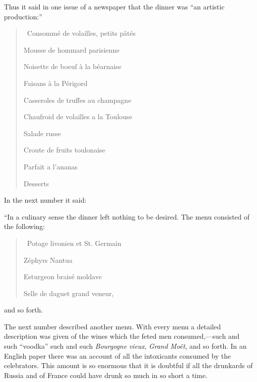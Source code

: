 \documentclass{book}
\begin{document}
Thus it said in one issue of a newspaper that the dinner was “an artistic production:”

\begin{quotation}\
	Consommé de volailles, petits pâtés

	Mousse de hommard parisienne

	Noisette de boeuf à la béarnaise

	Faisans à la Périgord

	Casseroles de truffes au champagne

	Chaufroid de volailles a la Toulouse

	Salade russe

	Croute de fruits toulonaise

	Parfait a l’ananas

	Desserts
\end{quotation}

In the next number it said:

“In a culinary sense the dinner left nothing to be desired. The menu consisted of the following:

\begin{quotation}\
	Potage livonien et St. Germain

	Zéphyrs Nantua

	Esturgeon braisé moldave

	Selle de daguet grand veneur,
\end{quotation}

and so forth.

The next number described another menu. With every menu a detailed description was given of the wines which the feted men consumed,—such and such “voodka” such and such \emph{Bourgogne vieux}, \emph{Grand Moët}, and so forth. In an English paper there was an account of all the intoxicants consumed by the celebrators. This amount is so enormous that it is doubtful if all the drunkards of Russia and of France could have drunk so much in so short a time.
\end{document}

